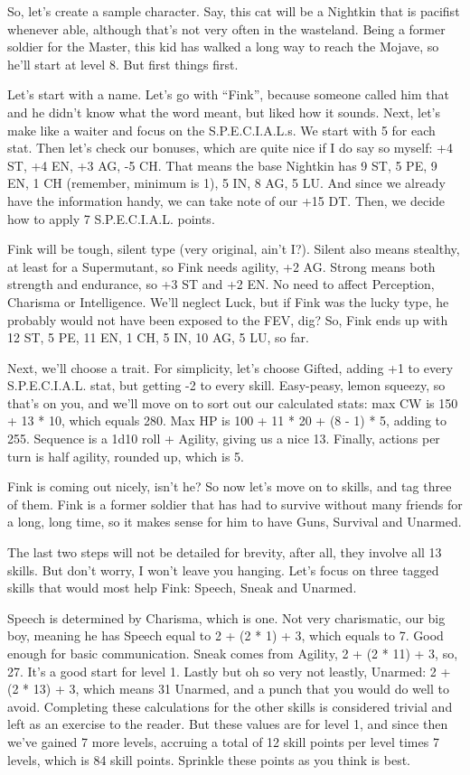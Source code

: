 \documentclass[11pt]{article} %
\begin{document}
So, let's create a sample character. Say, this cat will be a Nightkin that is pacifist whenever able, although that's not very often in the wasteland. Being a former soldier for the Master, this kid has walked a long way to reach the Mojave, so he'll start at level 8. But first things first.

Let's start with a name. Let's go with ``Fink'', because someone called him that and he didn't know what the word meant, but liked how it sounds. Next, let's make like a waiter and focus on the S.P.E.C.I.A.L.s. We start with 5 for each stat. Then let's check our bonuses, which are quite nice if I do say so myself: +4 ST, +4 EN, +3 AG, -5 CH. That means the base Nightkin has 9 ST, 5 PE, 9 EN, 1 CH (remember, minimum is 1), 5 IN, 8 AG, 5 LU. And since we already have the information handy, we can take note of our +15 DT. Then, we decide how to apply 7 S.P.E.C.I.A.L. points. 

Fink will be tough, silent type (very original, ain't I?). Silent also means stealthy, at least for a Supermutant, so Fink needs agility, +2 AG. Strong means both strength and endurance, so +3 ST and +2 EN. No need to affect Perception, Charisma or Intelligence. We'll neglect Luck, but if Fink was the lucky type, he probably would not have been exposed to the FEV, dig? So, Fink ends up with 12 ST, 5 PE, 11 EN, 1 CH, 5 IN, 10 AG, 5 LU, so far.

Next, we'll choose a trait. For simplicity, let's choose Gifted, adding +1 to every S.P.E.C.I.A.L. stat, but getting -2 to every skill. Easy-peasy, lemon squeezy, so that's on you, and we'll move on to sort out our calculated stats: max CW is 150 + 13 * 10, which equals 280. Max HP is 100 + 11 * 20 + (8 - 1) * 5, adding to 255. Sequence is a 1d10 roll + Agility, giving us a nice 13. Finally, actions per turn is half agility, rounded up, which is 5.

Fink is coming out nicely, isn't he? So now let's move on to skills, and tag three of them. Fink is a former soldier that has had to survive without many friends for a long, long time, so it makes sense for him to have Guns, Survival and Unarmed. 

The last two steps will not be detailed for brevity, after all, they involve all 13 skills. But don't worry, I won't leave you hanging. Let's focus on three tagged skills that would most help Fink: Speech, Sneak and Unarmed.

Speech is determined by Charisma, which is one. Not very charismatic, our big boy, meaning he has Speech equal to 2 + (2 * 1) + 3, which equals to 7. Good enough for basic communication. Sneak comes from Agility, 2 + (2 * 11) + 3, so, 27. It's a good start for level 1. Lastly but oh so very not leastly, Unarmed: 2 + (2 * 13) + 3, which means 31 Unarmed, and a punch that you would do well to avoid. Completing these calculations for the other skills is considered trivial and left as an exercise to the reader. But these values are for level 1, and since then we've gained 7 more levels, accruing a total of 12 skill points per level times 7 levels, which is 84 skill points. Sprinkle these points as you think is best.
\end{document}
